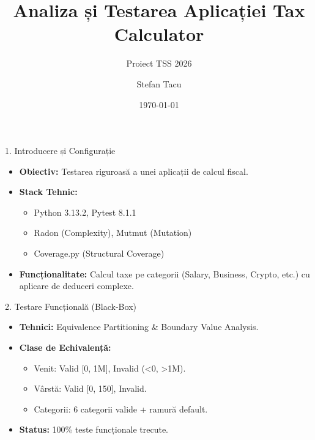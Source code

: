 \documentclass{beamer}
\title[Analiză și Testare Tax Calculator]{Analiza și Testarea Aplicației Tax Calculator}
\subtitle{Proiect TSS 2026}
\author{Stefan Tacu}
\date{\today}
\begin{document}
\begin{frame}
    \titlepage
\end{frame}

\begin{frame}{1. Introducere și Configurație}
    \begin{itemize}
        \item \textbf{Obiectiv:} Testarea riguroasă a unei aplicații de calcul fiscal.
        \item \textbf{Stack Tehnic:}
        \begin{itemize}
            \item Python 3.13.2, Pytest 8.1.1
            \item Radon (Complexity), Mutmut (Mutation)
            \item Coverage.py (Structural Coverage)
        \end{itemize}
        \item \textbf{Funcționalitate:} Calcul taxe pe categorii (Salary, Business, Crypto, etc.) cu aplicare de deduceri complexe.
    \end{itemize}
\end{frame}

\begin{frame}{2. Testare Funcțională (Black-Box)}
    \begin{itemize}
        \item \textbf{Tehnici:} Equivalence Partitioning \& Boundary Value Analysis.
        \item \textbf{Clase de Echivalență:}
        \begin{itemize}
            \item Venit: Valid [0, 1M], Invalid (<0, >1M).
            \item Vârstă: Valid [0, 150], Invalid.
            \item Categorii: 6 categorii valide + ramură default.
        \end{itemize}
        \item \textbf{Status:} 100\% teste funcționale trecute.
    \end{itemize}
\end{frame}
\end{document}
